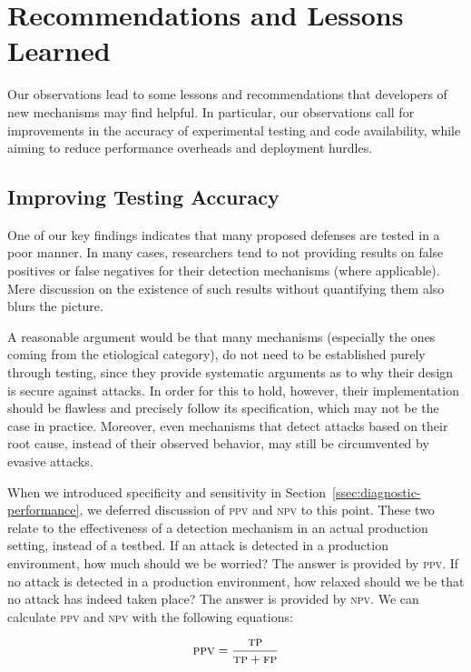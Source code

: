 \documentclass[10pt,journal,compsoc]{IEEEtran}
\begin{document}
\section{Recommendations and Lessons Learned}
\label{sec:lessons-learned}

Our observations lead to some lessons and recommendations that
developers of new mechanisms may find helpful. In particular,
our observations
call for improvements in the accuracy of experimental testing
and code availability, while
aiming to reduce performance overheads and deployment hurdles.

\subsection{Improving Testing Accuracy}

One of our key findings indicates that many proposed defenses are
tested in a poor manner. In many cases, researchers tend to not providing
results on false positives or false negatives for their detection mechanisms
(where applicable).
Mere discussion on the existence of such results without quantifying
them also blurs the picture.

A reasonable argument would be that many mechanisms (especially the
ones coming from the etiological category), do not need to be
established purely through testing, since they provide systematic
arguments as to why their design is secure against attacks. In order
for this to hold, however, their implementation should be flawless
and precisely follow its specification, which may not
be the case in practice. Moreover, even mechanisms that detect attacks
based on their root cause, instead of their observed behavior, may still be
circumvented by evasive attacks.

When we introduced specificity and sensitivity in
Section~\ref{ssec:diagnostic-performance}, we deferred discussion of
\textsc{ppv} and \textsc{npv} to this point. These two relate to the
effectiveness of a detection mechanism in an actual production setting,
instead of a testbed. If an attack is detected in a production
environment, how much should we be worried? The answer is provided by
\textsc{ppv}. If no attack is detected in a production environment,
how relaxed should we be that no attack has indeed taken place? The
answer is provided by \textsc{npv}. We can calculate \textsc{ppv} and
\textsc{npv} with the following equations:

\begin{equation}
\textsc{ppv} = \frac{\textsc{tp}}{\textsc{tp} + \textsc{fp}}
\end{equation}
\end{document}
